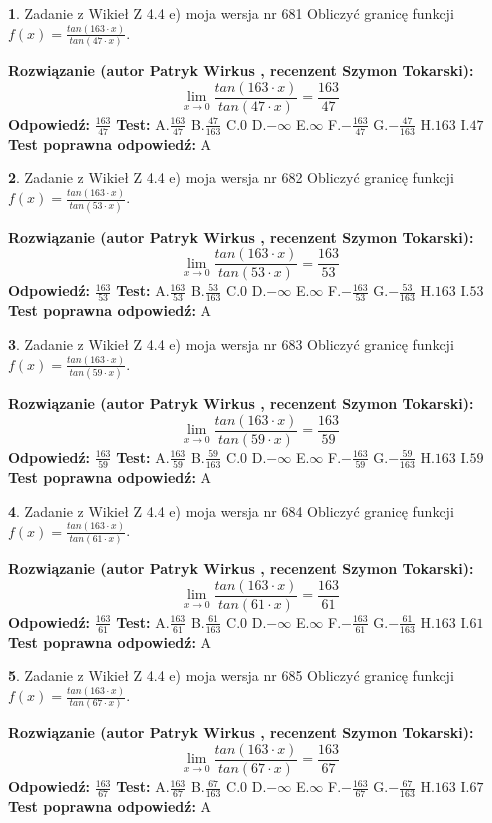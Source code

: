 \documentclass[12pt, a4paper]{article}
\theoremstyle{definition} %
\newtheorem{zad}{}
\newcommand{\zadStart}[1]{\begin{zad}#1\newline}
\newcommand{\zadStop}{\end{zad}}
\newcommand{\rozwStart}[2]{\noindent \textbf{Rozwiązanie (autor #1 , recenzent #2): }\newline}
\newcommand{\rozwStop}{\newline}
\newcommand{\odpStart}{\noindent \textbf{Odpowiedź:}\newline}
\newcommand{\odpStop}{\newline}
\newcommand{\testStart}{\noindent \textbf{Test:}\newline}
\newcommand{\testStop}{\newline}
\newcommand{\kluczStart}{\noindent \textbf{Test poprawna odpowiedź:}\newline}
\newcommand{\kluczStop}{\newline}
\begin{document}
\zadStart{Zadanie z Wikieł Z 4.4 e) moja wersja nr 681}
Obliczyć granicę funkcji $f(x)=\frac{tan(163\cdot x)}{tan(47\cdot x)}$.
\zadStop
\rozwStart{Patryk Wirkus}{Szymon Tokarski}
$$\lim\limits_{x\to 0}\frac{tan(163\cdot x)}{tan(47\cdot x)}=
\frac{163}{47}$$
\rozwStop
\odpStart
$\frac{163}{47}$
\odpStop
\testStart
A.$\frac{163}{47}$
B.$\frac{47}{163}$
C.$0$
D.$-\infty$
E.$\infty$
F.$-\frac{163}{47}$
G.$-\frac{47}{163}$
H.$163$
I.$47$
\testStop
\kluczStart
A
\kluczStop



\zadStart{Zadanie z Wikieł Z 4.4 e) moja wersja nr 682}
Obliczyć granicę funkcji $f(x)=\frac{tan(163\cdot x)}{tan(53\cdot x)}$.
\zadStop
\rozwStart{Patryk Wirkus}{Szymon Tokarski}
$$\lim\limits_{x\to 0}\frac{tan(163\cdot x)}{tan(53\cdot x)}=
\frac{163}{53}$$
\rozwStop
\odpStart
$\frac{163}{53}$
\odpStop
\testStart
A.$\frac{163}{53}$
B.$\frac{53}{163}$
C.$0$
D.$-\infty$
E.$\infty$
F.$-\frac{163}{53}$
G.$-\frac{53}{163}$
H.$163$
I.$53$
\testStop
\kluczStart
A
\kluczStop



\zadStart{Zadanie z Wikieł Z 4.4 e) moja wersja nr 683}
Obliczyć granicę funkcji $f(x)=\frac{tan(163\cdot x)}{tan(59\cdot x)}$.
\zadStop
\rozwStart{Patryk Wirkus}{Szymon Tokarski}
$$\lim\limits_{x\to 0}\frac{tan(163\cdot x)}{tan(59\cdot x)}=
\frac{163}{59}$$
\rozwStop
\odpStart
$\frac{163}{59}$
\odpStop
\testStart
A.$\frac{163}{59}$
B.$\frac{59}{163}$
C.$0$
D.$-\infty$
E.$\infty$
F.$-\frac{163}{59}$
G.$-\frac{59}{163}$
H.$163$
I.$59$
\testStop
\kluczStart
A
\kluczStop



\zadStart{Zadanie z Wikieł Z 4.4 e) moja wersja nr 684}
Obliczyć granicę funkcji $f(x)=\frac{tan(163\cdot x)}{tan(61\cdot x)}$.
\zadStop
\rozwStart{Patryk Wirkus}{Szymon Tokarski}
$$\lim\limits_{x\to 0}\frac{tan(163\cdot x)}{tan(61\cdot x)}=
\frac{163}{61}$$
\rozwStop
\odpStart
$\frac{163}{61}$
\odpStop
\testStart
A.$\frac{163}{61}$
B.$\frac{61}{163}$
C.$0$
D.$-\infty$
E.$\infty$
F.$-\frac{163}{61}$
G.$-\frac{61}{163}$
H.$163$
I.$61$
\testStop
\kluczStart
A
\kluczStop



\zadStart{Zadanie z Wikieł Z 4.4 e) moja wersja nr 685}
Obliczyć granicę funkcji $f(x)=\frac{tan(163\cdot x)}{tan(67\cdot x)}$.
\zadStop
\rozwStart{Patryk Wirkus}{Szymon Tokarski}
$$\lim\limits_{x\to 0}\frac{tan(163\cdot x)}{tan(67\cdot x)}=
\frac{163}{67}$$
\rozwStop
\odpStart
$\frac{163}{67}$
\odpStop
\testStart
A.$\frac{163}{67}$
B.$\frac{67}{163}$
C.$0$
D.$-\infty$
E.$\infty$
F.$-\frac{163}{67}$
G.$-\frac{67}{163}$
H.$163$
I.$67$
\testStop
\kluczStart
A
\kluczStop
\end{document}
